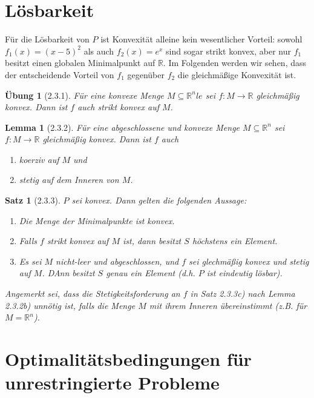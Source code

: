 \documentclass[12pt]{extreport} %
\newcommand{\R}{\mathbb{R}}
\theoremstyle{named}
\theoremstyle{nnamed}
\theoremstyle{itshape}
\newtheorem*{satz}{Satz}
\theoremstyle{normal}
\newtheorem*{lemma}{Lemma}
\newtheorem*{uebung}{Übung}
\begin{document}
\newpage

\section{Lösbarkeit}

Für die Lösbarkeit von $P$ ist Konvexität alleine kein wesentlicher Vorteil: sowohl $f_1(x) = (x - 5)^2$ als auch $f_2(x) = e^x$ sind sogar strikt konvex, aber nur $f_1$ besitzt einen globalen Minimalpunkt auf $\R$. Im Folgenden werden wir sehen, dass der entscheidende Vorteil von $f_1$ gegenüber $f_2$ die gleichmäßige Konvexität ist.

\begin{uebung}[2.3.1] %
	Für eine konvexe Menge $M \subseteq \R^nle$ sei $f \colon M \rightarrow \R$ gleichmäßig konvex. Dann ist $f$ auch strikt konvex auf $M$.	
\end{uebung}

\begin{lemma}[2.3.2]
	Für eine abgeschlossene und konvexe Menge $M \subseteq \R^n$ sei $f \colon M \rightarrow \R$ gleichmäßig konvex. Dann ist $f$ auch
	\begin{enumerate}
		\item koerziv auf $M$ und
		\item stetig auf dem Inneren von $M$.
	\end{enumerate}
\end{lemma}

\begin{satz}[2.3.3]
	$P$ sei konvex. Dann gelten die folgenden Aussage:
	\begin{enumerate}
		\item Die Menge der Minimalpunkte ist konvex.
		\item Falls $f$ strikt konvex auf $M$ ist, dann besitzt $S$ höchstens ein Element.
		\item Es sei $M$ nicht-leer und abgeschlossen, und $f$ sei glechmäßig konvex und stetig auf $M$. DAnn besitzt $S$ genau ein Element (d.h. $P$ ist eindeutig lösbar).
	\end{enumerate}	
	Angemerkt sei, dass die Stetigkeitsforderung an $f$ in Satz 2.3.3c) nach Lemma 2.3.2b) unnötig ist, falls die Menge $M$ mit ihrem Inneren übereinstimmt (z.B. für $M = \R^n$).
\end{satz}

\newpage

\section{Optimalitätsbedingungen für unrestringierte Probleme}
\end{document}
